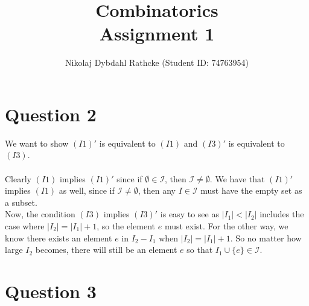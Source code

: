 \documentclass[a4paper, fleqn]{article}
\author{Nikolaj Dybdahl Rathcke (Student ID: 74763954)}
\title{Combinatorics \\ Assignment 1}
\begin{document}
\maketitle

\section*{Question 2}
We want to show $(I1)'$ is equivalent to $(I1)$ and $(I3)'$ is equivalent to $(I3)$. \\
\\
Clearly $(I1)$ implies $(I1)'$ since if $\emptyset \in \mathcal{I}$, then $\mathcal{I}\not = \emptyset$. We have that $(I1)'$ implies $(I1)$ as well, since if $\mathcal{I}\not = \emptyset$, then any $I\in \mathcal{I}$ must have the empty set as a subset.\\
Now, the condition $(I3)$ implies $(I3)'$ is easy to see as $|I_1|<|I_2|$ includes the case where $|I_2|=|I_1|+1$, so the element $e$ must exist. For the other way, we know there exists an element $e$ in $I_2-I_1$ when $|I_2|=|I_1|+1$. So no matter how large $I_2$ becomes, there will still be an element $e$ so that $I_1\cup \{e\}\in \mathcal{I}$.

\section*{Question 3}
\end{document}
